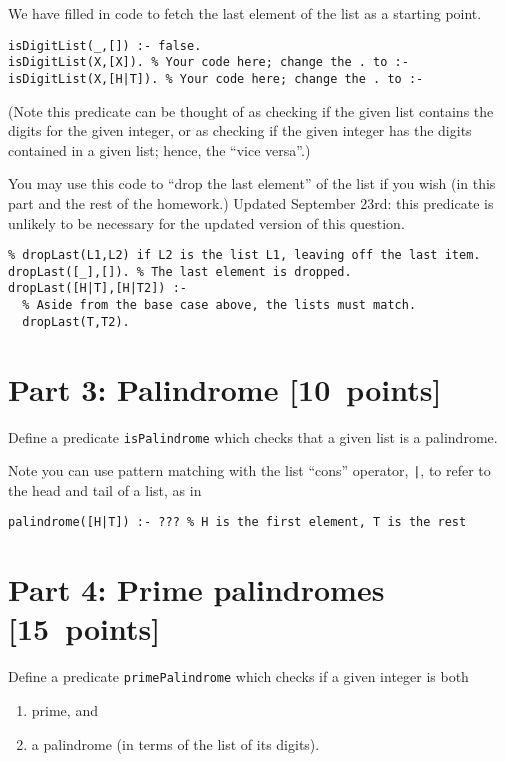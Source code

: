 \documentclass[11pt]{article}
\begin{document}
We have filled in code to fetch the last element of the list
as a starting point.
\begin{verbatim}
isDigitList(_,[]) :- false.
isDigitList(X,[X]). % Your code here; change the . to :-
isDigitList(X,[H|T]). % Your code here; change the . to :-
\end{verbatim}

(Note this predicate can be thought of as checking if the given list contains
the digits for the given integer, or as checking if the given integer
has the digits contained in a given list; hence, the “vice versa”.)

You may use this code to “drop the last element” of the list
if you wish (in this part and the rest of the homework.)
Updated September 23rd: this predicate is unlikely to be necessary
for the updated version of this question.
\begin{verbatim}
% dropLast(L1,L2) if L2 is the list L1, leaving off the last item.
dropLast([_],[]). % The last element is dropped.
dropLast([H|T],[H|T2]) :-
  % Aside from the base case above, the lists must match.
  dropLast(T,T2).
\end{verbatim}

\section*{Part 3: Palindrome                                     [10 points]}
\label{sec:orgfde2f49}
Define a predicate \texttt{isPalindrome} which checks that a given
list is a palindrome.

Note you can use pattern matching with the list “cons” operator, \texttt{|},
to refer to the head and tail of a list, as in
\begin{verbatim}
palindrome([H|T]) :- ??? % H is the first element, T is the rest
\end{verbatim}

\section*{Part 4: Prime palindromes                              [15 points]}
\label{sec:org0771564}
Define a predicate \texttt{primePalindrome} which checks
if a given integer is both
\begin{enumerate}
\item prime, and
\item a palindrome (in terms of the list of its digits).
\end{enumerate}
\end{document}
